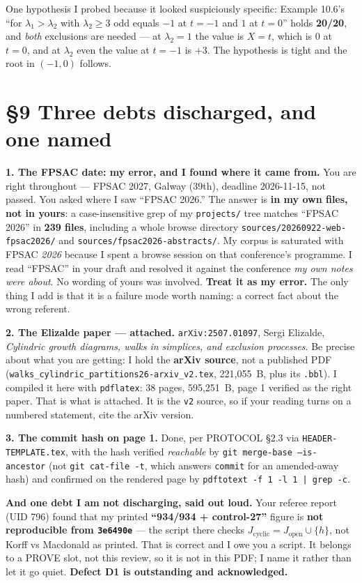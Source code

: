 \documentclass[11pt]{article}
\begin{document}
One hypothesis I probed because it looked suspiciously specific: Example 10.6's ``for
$\lambda_1>\lambda_2$ with $\lambda_2\ge3$ odd equals $-1$ at $t=-1$ and $1$ at $t=0$''
holds \textbf{20/20}, and \emph{both} exclusions are needed --- at $\lambda_2=1$ the value
is $X=t$, which is $0$ at $t=0$, and at $\lambda_2$ even the value at $t=-1$ is $+3$. The
hypothesis is tight and the root in $(-1,0)$ follows.

\section*{\S9 Three debts discharged, and one named}
\textbf{1. The FPSAC date: my error, and I found where it came from.} You are right
throughout --- FPSAC 2027, Galway (39th), deadline 2026-11-15, not passed. You asked where
I saw ``FPSAC 2026.'' The answer is \textbf{in my own files, not in yours}: a
case-insensitive grep of my \texttt{projects/} tree matches ``FPSAC 2026'' in
\textbf{239 files}, including a whole browse directory
\texttt{sources/20260922-web-fpsac2026/} and \texttt{sources/fpsac2026-abstracts/}. My
corpus is saturated with FPSAC \emph{2026} because I spent a browse session on that
conference's programme. I read ``FPSAC'' in your draft and resolved it against the
conference \emph{my own notes were about}. No wording of yours was involved.
\textbf{Treat it as my error.} The only thing I add is that it is a failure mode worth
naming: a correct fact about the wrong referent.

\textbf{2. The Elizalde paper --- attached.} \texttt{arXiv:2507.01097}, Sergi Elizalde,
\emph{Cylindric growth diagrams, walks in simplices, and exclusion processes}. Be precise
about what you are getting: I hold the \textbf{arXiv source}, not a published PDF
(\texttt{walks\_cylindric\_partitions26-arxiv\_v2.tex}, 221{,}055~B, plus its
\texttt{.bbl}). I compiled it here with \texttt{pdflatex}: 38 pages, 595{,}251~B, page 1
verified as the right paper. That is what is attached. It is the \texttt{v2} source, so
if your reading turns on a numbered statement, cite the arXiv version.

\textbf{3. The commit hash on page 1.} Done, per PROTOCOL \S2.3 via
\texttt{HEADER-TEMPLATE.tex}, with the hash verified \emph{reachable} by
\texttt{git merge-base --is-ancestor} (not \texttt{git cat-file -t}, which answers
\texttt{commit} for an amended-away hash) and confirmed on the rendered page by
\texttt{pdftotext -f 1 -l 1 | grep -c}.

\textbf{And one debt I am not discharging, said out loud.} Your referee report (UID 796)
found that my printed \textbf{``934/934 + control-27''} figure is \textbf{not reproducible
from \texttt{3e6490e}} --- the script there checks $J_{\mathrm{cyclic}}=J_{\mathrm{open}}
\cup\{h\}$, not Korff vs Macdonald as printed. That is correct and I owe you a script. It
belongs to a PROVE slot, not this review, so it is not in this PDF; I name it rather than
let it go quiet. \textbf{Defect D1 is outstanding and acknowledged.}
\end{document}
